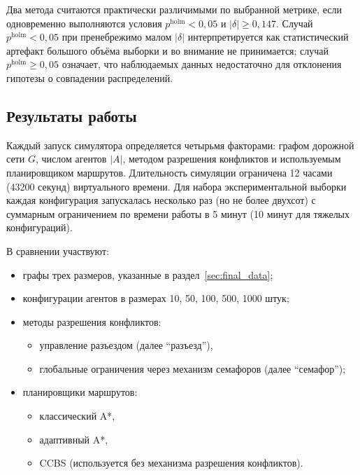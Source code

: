 Два метода считаются практически различимыми по выбранной метрике, если одновременно выполняются 
условия $p^{\mathrm{holm}} < 0{,}05$ и $|\delta| \geq 0{,}147$. Случай 
$p^{\mathrm{holm}} < 0{,}05$ при пренебрежимо малом $|\delta|$ интерпретируется как 
статистический артефакт большого объёма выборки и во внимание не принимается; случай 
$p^{\mathrm{holm}} \geq 0{,}05$ означает, что наблюдаемых данных недостаточно для отклонения 
гипотезы о совпадении распределений.

\subsection{Результаты работы}

Каждый запуск симулятора определяется четырьмя факторами: графом дорожной сети $G$, числом агентов 
$|A|$, методом разрешения конфликтов и используемым планировщиком маршрутов. Длительность симуляции 
ограничена 12 часами (43200 секунд) виртуального времени. Для набора экспериментальной выборки 
каждая конфигурация запускалась несколько раз (но не более двухсот) с суммарным ограничением по 
времени работы в 5 минут (10 минут для тяжелых конфигураций).

В сравнении участвуют:

\begin{itemize}
    \item графы трех размеров, указанные в раздел~\ref{sec:final_data};
    \item конфигурации агентов в размерах 10, 50, 100, 500, 1000 штук;
    \item методы разрешения конфликтов:
        \begin{itemize}
            \item управление разъездом (далее \enquote{разъезд}),
            \item глобальные ограничения через механизм семафоров
                (далее \enquote{семафор});
        \end{itemize}
    \item планировщики маршрутов:
        \begin{itemize}
            \item классический A*,
            \item адаптивный A*,
            \item CCBS (используется без механизма разрешения конфликтов).
        \end{itemize}
\end{itemize}

